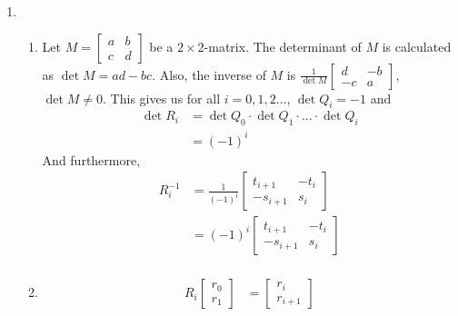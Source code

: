 \documentclass[11pt,a4paper]{article}
\begin{document}
\begin{enumerate}
    \item \begin{enumerate}
              \item Let $M = \begin{bmatrix}
                            a & b \\ c & d
                        \end{bmatrix}$ be a $2\times2$-matrix. The determinant of $M$ is calculated as $\det{M} = ad - bc$.
                    Also, the inverse of $M$ is $\frac{1}{\det{M}}\begin{bmatrix}
                            d & -b \\ -c&  a
                        \end{bmatrix}$,  $\det{M} \neq 0$. This gives us for all $i = 0, 1, 2\dots$, $\det{Q_i} = -1$ and
                    \begin{align*}
                        \det{R_i} & = \det{Q_0}\cdot\det{Q_1}\cdot ... \cdot \det{Q_i} \\
                                  & = (-1)^i
                    \end{align*}
                    And furthermore,
                    \begin{align*}
                        R_i^{-1} & = \frac{1}{(-1)^i}\begin{bmatrix}
                                                         t_{i + 1} & -t_i \\ -s_{i + 1} & s_i
                                                     \end{bmatrix} \\
                                 & = (-1)^i\begin{bmatrix}
                                               t_{i + 1} & -t_i \\ -s_{i + 1} & s_i
                                           \end{bmatrix}           \\
                    \end{align*}
              \item \begin{align*}
                        R_i\begin{bmatrix}
                               r_0 \\ r_1
                           \end{bmatrix}                      & = \begin{bmatrix}
                                                                      r_i \\ r_{i + 1}

\end{bmatrix}
\end{align*}
\end{enumerate}
\end{enumerate}
\end{document}
